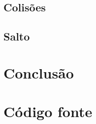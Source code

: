 \documentclass[12pt,a4paper,portuges]{style/myreport}
\begin{document}
\section{Colisões}

\section{Salto}

\newpage

\chapter{Conclusão}




\appendix
\chapter{Código fonte}
\end{document}

